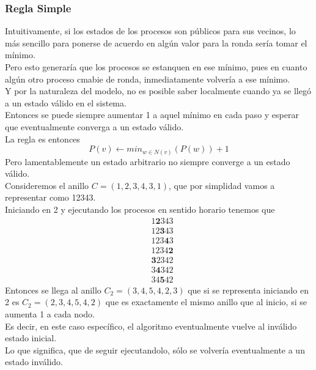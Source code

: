 \documentclass[12pt,a4paper]{article}
\begin{document}
{        \subsubsection{Regla Simple}{
        Intuitivamente, si los estados de los procesos son públicos para sus
        vecinos, lo más sencillo para ponerse de acuerdo en algún valor para la
        ronda sería tomar el mínimo.\\
        Pero esto generaría que los procesos se estanquen en ese mínimo, pues en
        cuanto algún otro proceso cmabie de ronda, inmediatamente volvería a ese
        mínimo.\\
        Y por la naturaleza del modelo, no es posible saber localmente cuando ya
        se llegó a un estado válido en el sistema.\\
        Entonces se puede siempre aumentar 1 a aquel mínimo en cada paso y
        esperar que eventualmente converga a un estado válido.\\
        La regla es entonces
        \[P(v) \leftarrow min_{w \in N(v)}(P(w)) + 1\]
        Pero lamentablemente un estado arbitrario no siempre converge a un estado
        válido.\\
        Consideremos el anillo $C = (1, 2, 3, 4, 3, 1)$, que por simplidad
        vamos a representar como 12343.\\
        Iniciando en 2 y ejecutando los procesos en sentido horario tenemos que
        \begin{align*}
            &1\textbf{2}343 \\
            &12\textbf{3}43 \\
            &123\textbf{4}3 \\
            &1234\textbf{2} \\
            &\textbf{3}2342 \\
            &3\textbf{4}342 \\
            &34\textbf{5}42
        \end{align*}
        Entonces se llega al anillo $C_2 = (3, 4, 5, 4, 2, 3)$ que si se representa
        iniciando en 2 es $C_2 = (2, 3, 4, 5, 4, 2)$ que es exactamente el mismo
        anillo que al inicio, si se aumenta 1 a cada nodo.\\
        Es decir, en este caso específico, el algoritmo eventualmente vuelve al
        inválido estado inicial.\\
        Lo que significa, que de seguir ejecutandolo, sólo se volvería
        eventualmente a un estado inválido.
        }

}
\end{document}
